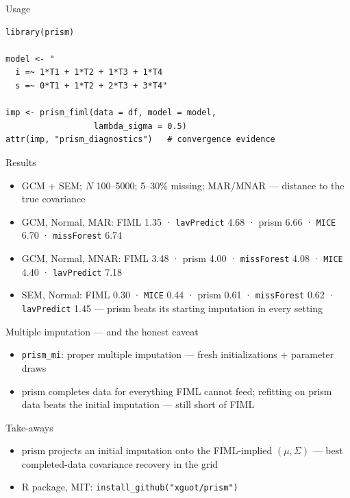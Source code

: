 \documentclass[presentation, aspectratio=169]{beamer}
\begin{document}
\begin{frame}[label={sec:orgb195e49},fragile]{Usage}
 \begin{verbatim}
library(prism)

model <- "
  i =~ 1*T1 + 1*T2 + 1*T3 + 1*T4
  s =~ 0*T1 + 1*T2 + 2*T3 + 3*T4"

imp <- prism_fiml(data = df, model = model,
                  lambda_sigma = 0.5)
attr(imp, "prism_diagnostics")   # convergence evidence
\end{verbatim}
\end{frame}

\begin{frame}[label={sec:orgee64611},fragile]{Results}
 \begin{itemize}
\item GCM + SEM; \(N\) 100–5000; 5–30\% missing; MAR/MNAR — distance to the
true covariance
\item GCM, Normal, MAR: FIML 1.35 · \texttt{lavPredict} 4.68 · prism 6.66 ·
\texttt{MICE} 6.70 · \texttt{missForest} 6.74
\item GCM, Normal, MNAR: FIML 3.48 · prism 4.00 · \texttt{missForest} 4.08 ·
\texttt{MICE} 4.40 · \texttt{lavPredict} 7.18
\item SEM, Normal: FIML 0.30 · \texttt{MICE} 0.44 · prism 0.61 · \texttt{missForest} 0.62 ·
\texttt{lavPredict} 1.45 — prism beats its starting imputation in every
setting
\end{itemize}
\end{frame}

\begin{frame}[label={sec:org49f0d67},fragile]{Multiple imputation — and the honest caveat}
 \begin{itemize}
\item \texttt{prism\_mi}: proper multiple imputation — fresh initializations +
parameter draws
\item prism completes data for everything FIML cannot feed; refitting on
prism data beats the initial imputation — still short of FIML
\end{itemize}
\end{frame}

\begin{frame}[label={sec:org563be16},fragile]{Take-aways}
 \begin{itemize}
\item prism projects an initial imputation onto the FIML-implied
\((\mu, \Sigma)\) — best completed-data covariance recovery in the grid
\item R package, MIT: \texttt{install\_github("xguot/prism")}
\end{itemize}
\end{frame}
\end{document}
